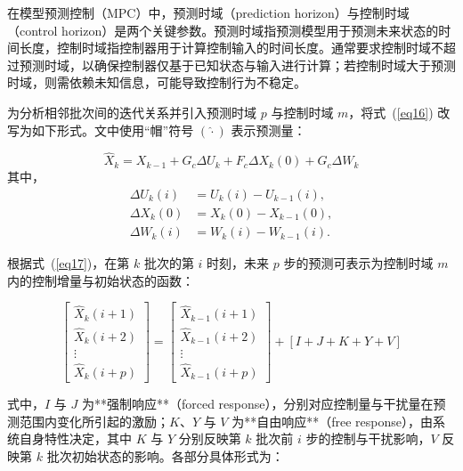 在模型预测控制（MPC）中，预测时域（prediction horizon）与控制时域（control horizon）是两个关键参数。预测时域指预测模型用于预测未来状态的时间长度，控制时域指控制器用于计算控制输入的时间长度。通常要求控制时域不超过预测时域，以确保控制器仅基于已知状态与输入进行计算；若控制时域大于预测时域，则需依赖未知信息，可能导致控制行为不稳定。

为分析相邻批次间的迭代关系并引入预测时域 $p$ 与控制时域 $m$，将式~(\ref{eq16}) 改写为如下形式。文中使用“帽”符号 $(\hat{\cdot})$ 表示预测量：

\begin{equation}
\hat{X}_k=X_{k-1}+G_c \Delta U_k+F_c \Delta X_k(0)+G_c \Delta W_k
\label{eq17}
\end{equation}
其中，
\begin{equation*}
\begin{aligned}
\Delta U_k(i) & =U_k(i)-U_{k-1}(i), \\
\Delta X_k(0) & =X_k(0)-X_{k-1}(0), \\
\Delta W_k(i) & =W_k(i)-W_{k-1}(i).
\end{aligned}
\end{equation*}

根据式~(\ref{eq17})，在第 $k$ 批次的第 $i$ 时刻，未来 $p$ 步的预测可表示为控制时域 $m$ 内的控制增量与初始状态的函数：

\begin{equation}
\left[\begin{array}{l}
\hat{X}_k(i+1) \\
\hat{X}_k(i+2) \\
\vdots \\
\hat{X}_k(i+p)
\end{array}\right]=\left[\begin{array}{l}
\hat{X}_{k-1}(i+1) \\
\hat{X}_{k-1}(i+2) \\
\vdots \\
\hat{X}_{k-1}(i+p)
\end{array}\right]+[I+J+K+Y+V]
\label{eq18}
\end{equation}

式中，$I$ 与 $J$ 为**强制响应**（forced response），分别对应控制量与干扰量在预测范围内变化所引起的激励；$K$、$Y$ 与 $V$ 为**自由响应**（free response），由系统自身特性决定，其中 $K$ 与 $Y$ 分别反映第 $k$ 批次前 $i$ 步的控制与干扰影响，$V$ 反映第 $k$ 批次初始状态的影响。各部分具体形式为：

